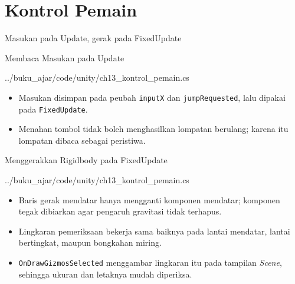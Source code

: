 \documentclass[aspectratio=169,10pt]{beamer}
\begin{document}
\section{Kontrol Pemain}
  {Masukan pada Update, gerak pada FixedUpdate}

\begin{frame}[fragile]{Membaca Masukan pada Update}

  {../buku_ajar/code/unity/ch13_kontrol_pemain.cs}
\begin{itemize}
  \item Masukan disimpan pada peubah \texttt{inputX} dan \texttt{jumpRequested},
        lalu dipakai pada \texttt{FixedUpdate}.
  \item Menahan tombol tidak boleh menghasilkan lompatan berulang; karena itu
        lompatan dibaca sebagai peristiwa.
\end{itemize}
\end{frame}

\begin{frame}[fragile]{Menggerakkan Rigidbody pada FixedUpdate}

  {../buku_ajar/code/unity/ch13_kontrol_pemain.cs}
\begin{itemize}
  \item Baris gerak mendatar hanya mengganti komponen mendatar; komponen tegak
        dibiarkan agar pengaruh gravitasi tidak terhapus.
  \item Lingkaran pemeriksaan bekerja sama baiknya pada lantai mendatar,
        lantai bertingkat, maupun bongkahan miring.
  \item \texttt{OnDrawGizmosSelected} menggambar lingkaran itu pada tampilan
        \emph{Scene}, sehingga ukuran dan letaknya mudah diperiksa.
\end{itemize}
\end{frame}
\end{document}
